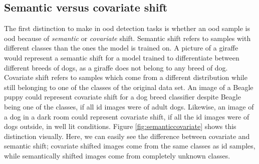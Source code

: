 \documentclass[UKenglish]{uiomasterthesis} %
\theoremstyle{definition}
\begin{document}
\subsection{Semantic versus covariate shift}

The first distinction to make in \ac{ood} detection tasks is whether an \ac{ood} sample is \ac{ood} because of {\it semantic} or {\it covariate} shift. Semantic shift refers to samples with different classes than the ones the model is trained on. A picture of a giraffe would represent a semantic shift for a model trained to differentiate between different breeds of dogs, as a giraffe does not belong to any breed of dog. Covariate shift refers to samples which come from a different distribution while still belonging to one of the classes of the original data set. An image of a Beagle puppy could represent covariate shift for a dog breed classifier despite Beagle being one of the classes, if all \ac{id} images were of adult dogs. Likewise, an image of a dog in a dark room could represent covariate shift, if all the \ac{id} images were of dogs outside, in well lit conditions. Figure \ref{fig:semanticcovariate} shows this distinction visually. Here, we can easily see the difference between covariate and semantic shift; covariate shifted images come from the same classes as \ac{id} samples, while semantically shifted images come from completely unknown classes.
\end{document}
